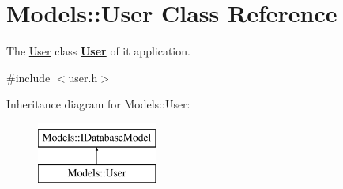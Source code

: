 \hypertarget{classModels_1_1User}{\section{Models\+:\+:User Class Reference}
\label{classModels_1_1User}
}


The \hyperlink{classModels_1_1User}{User} class {\bfseries \hyperlink{classModels_1_1User}{User}} of it application.  




{\ttfamily \#include $<$user.\+h$>$}

Inheritance diagram for Models\+:\+:User\+:\begin{figure}[H]
\begin{center}
\leavevmode
\includegraphics[height=2.000000cm]{df/d68/classModels_1_1User}
\end{center}
\end{figure}
